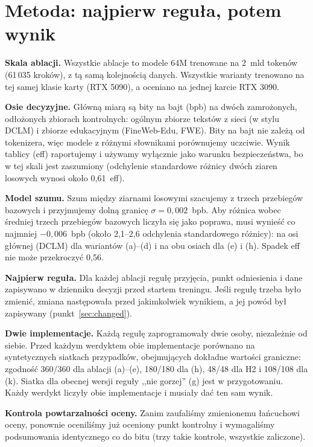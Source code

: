 \section{Metoda: najpierw reguła, potem wynik}

\textbf{Skala ablacji.} Wszystkie ablacje to modele 64M trenowane na 2~mld tokenów (61\,035 kroków), z tą samą
kolejnością danych. Wszystkie warianty trenowano na tej samej klasie karty (RTX 5090), a oceniano na jednej karcie
RTX 3090.

\textbf{Osie decyzyjne.} Główną miarą są bity na bajt (bpb) na dwóch zamrożonych, odłożonych zbiorach kontrolnych:
ogólnym zbiorze tekstów z sieci (w stylu DCLM) i zbiorze edukacyjnym (FineWeb-Edu, FWE). Bity na bajt nie zależą od
tokenizera, więc modele z różnymi słownikami porównujemy uczciwie. Wynik tablicy (eff) raportujemy i używamy wyłącznie
jako warunku bezpieczeństwa, bo w tej skali jest zaszumiony (odchylenie standardowe różnicy dwóch ziaren losowych
wynosi około 0,61~eff).

\textbf{Model szumu.} Szum między ziarnami losowymi szacujemy z trzech przebiegów bazowych i przyjmujemy dolną granicę
$\sigma = 0{,}002$~bpb. Aby różnica wobec średniej trzech przebiegów bazowych liczyła się jako poprawa, musi wynieść co
najmniej $-0{,}006$~bpb (około 2,1--2,6 odchylenia standardowego różnicy): na osi głównej (DCLM) dla wariantów
(a)--(d) i na obu osiach dla (e) i (h). Spadek eff nie może przekroczyć 0,56.

\textbf{Najpierw reguła.} Dla każdej ablacji regułę przyjęcia, punkt odniesienia i dane zapisywano w dzienniku decyzji
przed startem treningu. Jeśli regułę trzeba było zmienić, zmiana następowała przed jakimkolwiek wynikiem, a jej powód
był zapisywany (punkt~\ref{sec:changed}).

\textbf{Dwie implementacje.} Każdą regułę zaprogramowały dwie osoby, niezależnie od siebie. Przed każdym werdyktem
obie implementacje porównano na syntetycznych siatkach przypadków, obejmujących dokładne wartości graniczne: zgodność
360/360 dla ablacji (a)--(e), 180/180 dla (h), 48/48 dla H2 i 108/108 dla (k). Siatka dla obecnej wersji reguły
,,nie gorzej'' (g) jest w przygotowaniu. Każdy werdykt liczyły obie implementacje i musiały dać ten sam wynik.

\textbf{Kontrola powtarzalności oceny.} Zanim zaufaliśmy zmienionemu łańcuchowi oceny, ponownie oceniliśmy już
oceniony punkt kontrolny i wymagaliśmy podsumowania identycznego co do bitu (trzy takie kontrole, wszystkie
zaliczone).


